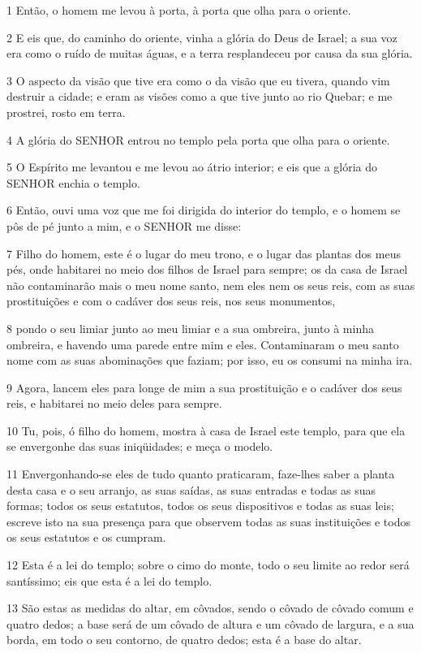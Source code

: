 \par 1 Então, o homem me levou à porta, à porta que olha para o oriente.
\par 2 E eis que, do caminho do oriente, vinha a glória do Deus de Israel; a sua voz era como o ruído de muitas águas, e a terra resplandeceu por causa da sua glória.
\par 3 O aspecto da visão que tive era como o da visão que eu tivera, quando vim destruir a cidade; e eram as visões como a que tive junto ao rio Quebar; e me prostrei, rosto em terra.
\par 4 A glória do SENHOR entrou no templo pela porta que olha para o oriente.
\par 5 O Espírito me levantou e me levou ao átrio interior; e eis que a glória do SENHOR enchia o templo.
\par 6 Então, ouvi uma voz que me foi dirigida do interior do templo, e o homem se pôs de pé junto a mim, e o SENHOR me disse:
\par 7 Filho do homem, este é o lugar do meu trono, e o lugar das plantas dos meus pés, onde habitarei no meio dos filhos de Israel para sempre; os da casa de Israel não contaminarão mais o meu nome santo, nem eles nem os seus reis, com as suas prostituições e com o cadáver dos seus reis, nos seus monumentos,
\par 8 pondo o seu limiar junto ao meu limiar e a sua ombreira, junto à minha ombreira, e havendo uma parede entre mim e eles. Contaminaram o meu santo nome com as suas abominações que faziam; por isso, eu os consumi na minha ira.
\par 9 Agora, lancem eles para longe de mim a sua prostituição e o cadáver dos seus reis, e habitarei no meio deles para sempre.
\par 10 Tu, pois, ó filho do homem, mostra à casa de Israel este templo, para que ela se envergonhe das suas iniqüidades; e meça o modelo.
\par 11 Envergonhando-se eles de tudo quanto praticaram, faze-lhes saber a planta desta casa e o seu arranjo, as suas saídas, as suas entradas e todas as suas formas; todos os seus estatutos, todos os seus dispositivos e todas as suas leis; escreve isto na sua presença para que observem todas as suas instituições e todos os seus estatutos e os cumpram.
\par 12 Esta é a lei do templo; sobre o cimo do monte, todo o seu limite ao redor será santíssimo; eis que esta é a lei do templo.
\par 13 São estas as medidas do altar, em côvados, sendo o côvado de côvado comum e quatro dedos; a base será de um côvado de altura e um côvado de largura, e a sua borda, em todo o seu contorno, de quatro dedos; esta é a base do altar.
